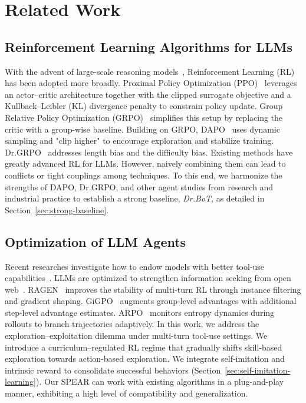 \documentclass[]{youtu} %
\newcommand{\method}{\textsc{SPEAR}\xspace}
\begin{document}
\section{Related Work}
\label{sec:related}



\subsection{Reinforcement Learning Algorithms for LLMs}


With the advent of large-scale reasoning models~\cite{jaech2024openai}, Reinforcement Learning (RL)~\cite{ouyang2022training} has been adopted more broadly.
Proximal Policy Optimization (PPO)~\cite{schulman2017proximal}
leverages an actor–critic architecture together with the clipped surrogate objective and a Kullback–Leibler (KL) divergence penalty to constrain policy update.
Group Relative Policy Optimization (GRPO)~\cite{guo2025deepseek,shao2024deepseekmath} simplifies this setup by replacing the critic with a group-wise baseline.
Building on GRPO, 
DAPO~\cite{yu2025dapo} uses dynamic sampling and "clip higher" to encourage exploration and stabilize training.
Dr.GRPO~\cite{liu2025understanding} addresses length bias and the difficulty bias.
Existing methods have greatly advanced RL for LLMs.
However, naively combining them can lead to conflicts or tight couplings among techniques.
To this end, we harmonize the strengths of DAPO, Dr.GRPO, and other agent studies from research and industrial practice to establish a strong baseline, \textit{Dr.BoT}, as detailed in Section~\ref{sec:strong-baseline}.


\subsection{Optimization of LLM Agents}


Recent researches investigate how to endow models with better tool-use capabilities~\cite{feng2025retool, li2025torl, xue2025simpletir}.
LLMs are optimized to strengthen information seeking from open web~\cite{jin2025search,tao2025webshaper,gao2025beyond}.
RAGEN~\cite{wang2025ragen} improves the stability of multi-turn RL through instance filtering and gradient shaping.
GiGPO~\cite{feng2025group} augments group-level advantages with additional step-level advantage estimates.
ARPO~\cite{dong2025agentic} monitors entropy dynamics during rollouts to branch trajectories adaptively.
In this work, we address the exploration–exploitation dilemma under multi-turn tool-use settings.
We introduce a curriculum–regulated RL regime that gradually shifts skill-based exploration towards action-based exploration.
We integrate self-imitation and intrinsic reward to consolidate successful behaviors (Section~\ref{sec:self-imitation-learning}).
Our \method can work with existing algorithms in a plug-and-play manner,
exhibiting a high level of compatibility and generalization.
\end{document}
